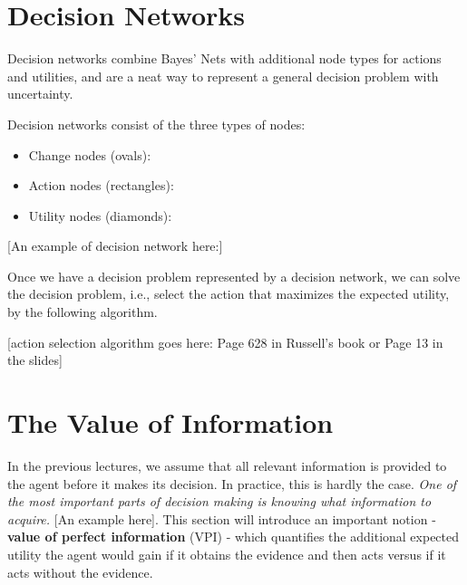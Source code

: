 \documentclass[11pt,fleqn]{article}
\def\title{Note \the\lecturenumber}
\begin{document}
\maketitle


\iffalse
\documentclass[11pt,fleqn]{article}
\usepackage{latexsym,epsf,amsmath,amsfonts,graphicx,url}

\title{Note 6}

\newcommand{\F}{\mathbb{F}}
\newcommand{\Z}{\mathbb{Z}}
\newcommand{\Q}{\mathbb{Q}}
\newcommand{\R}{\mathbb{R}}
\newcommand{\C}{\mathbb{C}}

\begin{document}

\maketitle
\fi

\section{Decision Networks}
Decision networks combine Bayes' Nets with additional node types for actions and utilities, and are a neat way to represent a general decision problem with uncertainty.

Decision networks consist of the three types of nodes:
\begin{itemize}
\item Change nodes (ovals):
\item Action nodes (rectangles): 
\item Utility nodes (diamonds):
\end{itemize}

[An example of decision network here:]

Once we have a decision problem represented by a decision network, we can solve the decision problem, i.e., select the action that maximizes the expected utility, by the following algorithm. 

[action selection algorithm goes here: Page 628 in Russell's book or Page 13 in the slides]



\section{The Value of Information}
In the previous lectures, we assume that all relevant information is provided to the agent before it makes its decision. In practice, this is hardly the case. \textit{One of the most important parts of decision making is knowing what information to acquire.} [An example here]. This section will introduce an important notion - \textbf{value of perfect information} (VPI) - which quantifies the additional expected utility the agent would gain if it obtains the evidence and then acts versus if it acts without the evidence.



\end{document}
\end{document}
